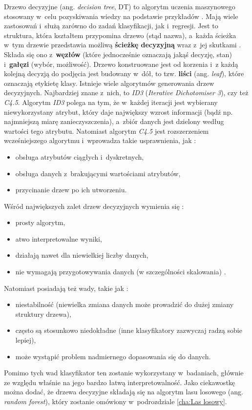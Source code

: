 Drzewo decyzyjne (ang. \textit{decision tree}, DT) to algorytm uczenia maszynowego stosowany w~celu pozyskiwania wiedzy na podstawie przykładów \cite{wiki:dec.drzewo}. Mają wiele zastosowań i~służą zarówno do zadań klasyfikacji, jak i~regresji. Jest to struktura, która kształtem przypomina drzewo (stąd nazwa), a~każda ścieżka w~tym drzewie przedstawia możliwą \textbf{ścieżkę decyzyjną} wraz z~jej skutkami \cite{Grus18}. Składa się ono z~\textbf{węzłów} (które jednocześnie oznaczają jakąś decyzję, stan) i~\textbf{gałęzi} (wybór, możliwość). Drzewo konstruowane jest od korzenia i~z każdą kolejną decyzją do podjęcia jest budowany w~dół, to tzw. \textbf{liści} (ang. \textit{leaf}), które oznaczają etykietę klasy. Istnieje wiele algorytmów generowania drzew decyzyjnych. Najbardziej znane z~nich, to \textit{ID3} (\textit{Iterative Dichotomiser 3}), czy też \textit{C4.5}. Algorytm \textit{ID3} polega na tym, że w~każdej iteracji jest wybierany niewykorzystany atrybut, który daje największy wzrost informacji (bądź np. najmniejszą miarę zanieczyszczenia), a~zbiór danych jest dzielony według wartości tego atrybutu. Natomiast algorytm \textit{C4.5} jest rozszerzeniem wcześniejszego algorytmu i~wprowadza takie usprawnienia, jak \cite{Quinlan96}:
\begin{itemize}
\item
obsługa atrybutów ciągłych i~dyskretnych,

\item
obsługa danych z~brakującymi wartościami atrybutów,

\item
przycinanie drzew po ich utworzeniu.
\end{itemize}
\noindent Wśród największych zalet drzew decyzyjnych wymienia się \cite{wiki:dec.tree}:
\begin{itemize}
\item
prosty algorytm,

\item
atwo interpretowalne wyniki,

\item
działają nawet dla niewielkiej liczby danych,

\item
nie wymagają przygotowywania danych (w szczególności skalowania) \cite{Sawka18}.
\end{itemize}
\noindent Natomiast posiadają też wady, takie jak \cite{wiki:dec.tree}:
\begin{itemize}
\item
niestabilność (niewielka zmiana danych może prowadzić do dużej zmiany struktury drzewa),

\item
często są stosunkowo niedokładne (inne klasyfikatory zazwyczaj radzą sobie lepiej),

\item
może wystąpić problem nadmiernego dopasowania się do danych.
\end{itemize}
\noindent Pomimo tych wad klasyfikator ten zostanie wykorzystany w~badaniach, głównie ze względu właśnie na jego bardzo łatwą interpretowalność.
Jako ciekawostkę można dodać, że drzewa decyzyjne składają się na algorytm lasu losowego (ang. \textit{random forest}), który zostanie omówiony w~podrozdziale \ref{cha:Las losowy}. 

